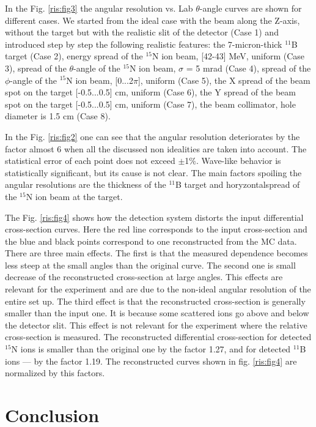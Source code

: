 \documentclass[%
 aip,
cp,  %
 amsmath,amssymb,%
 reprint,%
]{revtex4-2}
\begin{document}
In the Fig. \ref{ris:fig3} the angular resolution vs. Lab $\theta$-angle curves are shown for different cases. We started from the ideal case with the beam along the Z-axis, without the target but with the realistic slit of the detector (Case 1) and introduced step by step the following realistic features: the 7-micron-thick ${}^{11}$B target (Case 2), energy spread of the ${}^{15}$N ion beam, [42-43] MeV, uniform (Case 3), spread of the $\theta$-angle of the ${}^{15}$N ion beam, $\sigma$ = 5 mrad (Case 4),  spread of the $\phi$-angle of the ${}^{15}$N ion beam, [0...2$\pi$], uniform (Case 5), the X spread of the beam spot on the target [-0.5...0.5] cm, uniform (Case 6), the Y spread of the beam spot on the target [-0.5...0.5] cm, uniform (Case 7), the beam collimator, hole diameter is 1.5 cm  (Case 8).


In the Fig. \ref{ris:fig2} one can see that the angular resolution deteriorates by the factor almost 6 when all the discussed non idealities are taken into account. The statistical error of each point does not exceed $\pm$1$\%$. Wave-like behavior is statistically significant, but its cause is not clear. The main factors spoiling the angular resolutions are the thickness of the ${}^{11}$B target and horyzontalspread of the ${}^{15}$N ion beam at the target.

The Fig. \ref{ris:fig4} shows how the detection system distorts the input differential cross-section curves. Here the red line corresponds to the input cross-section and the blue and black points correspond to one reconstructed from the MC data. There are three main effects. The first is that the measured dependence becomes less steep at the small angles than the original curve. The second one is small decrease of the reconstructed cross-section at large angles. This effects are relevant for the experiment and are due to the non-ideal angular resolution of the entire set up.
The third effect is that the reconstructed cross-section is generally smaller than the input one. It is because some scattered ions go above and below the detector slit. This effect is not relevant for the experiment where the relative cross-section is measured. The reconstructed differential cross-section for detected ${}^{15}$N ions is smaller than the original one by the factor 1.27, and for detected ${}^{11}$B ions --- by the factor 1.19.  The reconstructed curves shown in  fig. \ref{ris:fig4} are normalized by this factors.

\section{Conclusion}
\end{document}
